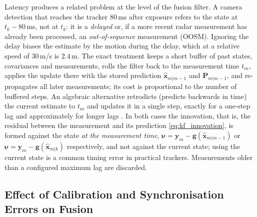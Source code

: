 \documentclass[graybox,envcountchap]{style/SNmono}
\begin{document}
Latency produces a related problem at the level of the fusion filter. A camera detection that reaches the tracker $80$\,ms after exposure refers to the state at $t_{k}-80$\,ms, not at $t_{k}$: it is a \emph{delayed} or, if a more recent radar measurement has already been processed, an \emph{out-of-sequence} measurement (OOSM). Ignoring the delay biases the estimate by the motion during the delay, which at a relative speed of $30$\,m/s is $2.4$\,m. The exact treatment keeps a short buffer of past states, covariances and measurements, rolls the filter back to the measurement time $t_{m}$, applies the update there with the stored prediction $\widehat{\mathbf{x}}_{m|m-1}$ and $\mathbf{P}_{m|m-1}$, and re-propagates all later measurements; its cost is proportional to the number of buffered steps. An algebraic alternative retrodicts (predicts backwards in time) the current estimate to $t_{m}$ and updates it in a single step, exactly for a one-step lag and approximately for longer lags \cite{barshalom2002_oosm,barshalom2001_estimation}. In both cases the innovation, that is, the residual between the measurement and its prediction \eqref{eq:kf_innovation}, is formed against the state \emph{at the measurement time}, $\boldsymbol{\nu}=\mathbf{y}_{m}-\mathbf{g}(\widehat{\mathbf{x}}_{m|m-1})$ or $\boldsymbol{\nu}=\mathbf{y}_{m}-\mathbf{g}(\widehat{\mathbf{x}}_{m|k})$ respectively, and not against the current state; using the current state is a common timing error in practical trackers. Measurements older than a configured maximum lag are discarded.

\subsection{Effect of Calibration and Synchronisation Errors on Fusion}
\label{subsec:calibration-errors}
\end{document}
